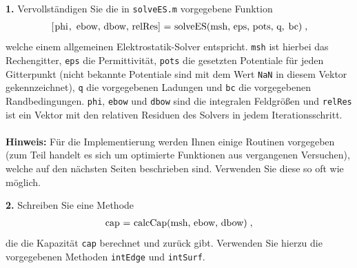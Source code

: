 \documentclass[Protokollheft.tex]{subfiles}
\begin{document}
\begin{framed}
	\noindent \textbf{1.} Vervollständigen Sie die in \lstinline{solveES.m} vorgegebene Funktion
\begin{align}
\lstinline{[phi, ebow, dbow, relRes] = solveES(msh, eps, pots, q, bc)} \; ,
\end{align}
welche einem allgemeinen Elektrostatik-Solver entspricht. \lstinline{msh} ist hierbei das Rechengitter, \lstinline{eps} die Permittivität, \lstinline{pots} die gesetzten Potentiale für jeden Gitterpunkt (nicht bekannte Potentiale sind mit dem Wert \lstinline{NaN} in diesem Vektor gekennzeichnet), \lstinline{q} die vorgegebenen Ladungen und \lstinline{bc} die vorgegebenen Randbedingungen. \lstinline{phi}, \lstinline{ebow} und \lstinline{dbow} sind die integralen Feldgrößen und \lstinline{relRes} ist ein Vektor mit den relativen Residuen des Solvers in jedem Iterationsschritt.\\
\ \\
{\textbf{Hinweis:}} Für die Implementierung werden Ihnen einige Routinen vorgegeben
(zum Teil handelt es sich um optimierte Funktionen aus vergangenen Versuchen), welche auf den nächsten Seiten beschrieben sind. Verwenden Sie diese so oft wie möglich.\label{exer:solveES}
\end{framed}


\begin{framed}
	\noindent \textbf{2.} Schreiben Sie eine Methode
\begin{align}
\lstinline{cap = calcCap(msh, ebow, dbow)} \; ,
\end{align}
die die Kapazität \lstinline{cap} berechnet und zurück gibt. Verwenden Sie hierzu die vorgegebenen Methoden \lstinline{intEdge} und
\lstinline{intSurf}.\label{exer:calcCap}
\end{framed}
\end{document}

